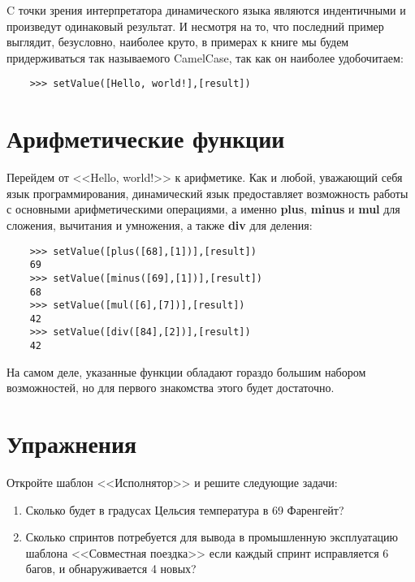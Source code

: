 \documentclass[../index.tex]{subfiles}
\begin{document}
	C точки зрения интерпретатора динамического языка являются индентичными и произведут одинаковый результат. И несмотря на то, что последний пример выглядит, безусловно, наиболее круто, в примерах к книге мы будем придерживаться так называемого CamelCase, так как он наиболее удобочитаем:
	
	\begin{verbatim}
	>>> setValue([Hello, world!],[result])
	\end{verbatim}
	
	\section{Арифметические функции}
	
	Перейдем от <<Hello, world!>> к арифметике. Как и любой, уважающий себя язык программирования, динамический язык предоставляет возможность работы с основными арифметическими операциями, а именно {\bf plus}, {\bf minus} и {\bf mul} для сложения, вычитания и умножения, а также {\bf div} для деления:
	
	\begin{verbatim}
	>>> setValue([plus([68],[1])],[result])
	69
	>>> setValue([minus([69],[1])],[result])
	68
	>>> setValue([mul([6],[7])],[result])
	42
	>>> setValue([div([84],[2])],[result])
	42
	\end{verbatim}
	
	На самом деле, указанные функции обладают гораздо большим набором возможностей, но для первого знакомства этого будет достаточно. 
				
	\section{Упражнения}
	
	Откройте шаблон <<Исполнятор>> и решите следующие задачи:
	
	\begin{enumerate}
		\item Сколько будет в градусах Цельсия температура в 69 Фаренгейт?
		
		\item Сколько спринтов потребуется для вывода в промышленную эксплуатацию шаблона <<Совместная поездка>> если каждый спринт исправляется 6 багов, и обнаруживается 4 новых?
    \end{enumerate}
\end{document}
